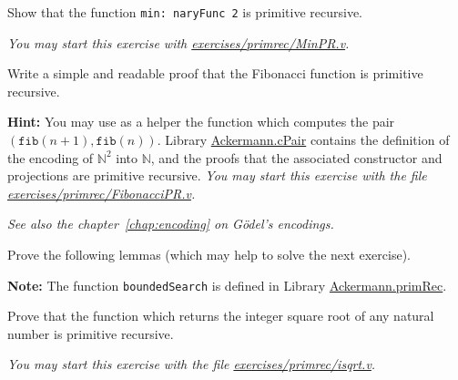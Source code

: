 \begin{exercise}
Show that the function \texttt{min: naryFunc\,2} is primitive
recursive.

\emph{You may start this exercise with
    \href{https://github.com/coq-community/hydra-battles/blob/master/exercises/primrec/MinPR.v}{exercises/primrec/MinPR.v}.}

\end{exercise}


\begin{exercise}
Write a simple and readable proof that the Fibonacci function is primitive recursive.




\textbf{Hint:}  You may use as a helper the function which computes the pair \linebreak
$(\texttt{fib}(n+1),\texttt{fib}(n))$. 
Library \href{../theories/html/hydras.Ackermann.cPair.html}{Ackermann.cPair} contains
the definition of the encoding of $\mathbb{N}^2$ into $\mathbb{N}$, and the proofs that 
the associated constructor and projections are primitive recursive.  
\emph{You may start this exercise with the file
  \href{https://github.com/coq-community/hydra-battles/blob/master/exercises/primrec/FibonacciPR.v}{exercises/primrec/FibonacciPR.v}.}

\vspace{4pt}

\emph{See also the chapter~\ref{chap:encoding} on G\"{o}del's encodings.}

\end{exercise}

\begin{exercise}

Prove the following lemmas (which may help to solve the next  exercise).


\textbf{Note:}  The function \texttt{boundedSearch} is defined
in Library \href{../theories/html/hydras.Ackermann.primRec.html}{Ackermann.primRec}. 
\end{exercise}


\begin{exercise}
Prove that the function which returns the  integer square root of any natural number  is primitive recursive.

\emph{You may start this exercise with the file
    \href{https://github.com/coq-community/hydra-battles/blob/master/exercises/primrec/isqrt.v}{exercises/primrec/isqrt.v}.}

\end{exercise}

